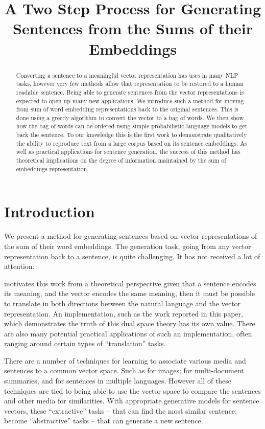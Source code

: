 \documentclass[11pt]{article}
\title{A Two Step Process for Generating Sentences from the Sums of their Embeddings}
\author{}
\theoremstyle{plain}
\theoremstyle{definition}
\begin{document}
\maketitle

\begin{abstract}
Converting a sentence to a meaningful vector representation has uses in many NLP tasks, however very few methods allow that representation to be restored to a human readable sentence. Being able to generate sentences from the vector representations is expected to open up many new applications. We introduce such a method for moving from sum of word embedding representations back to the original sentences. This is done using a greedy algorithm to convert the vector to a bag of words. We then show how the bag of words can be ordered using simple probabilistic language models to get back the sentence. To our knowledge this is the first work to demonstrate qualitatively the ability to reproduce text from a large corpus based on its sentence embeddings. 
As well as practical applications for sentence generation, the success of this method has theoretical implications on the degree of information maintained by the sum of embeddings representation.
\end{abstract}

\section{Introduction} \label{intro}
We present a method for generating sentences based on vector representations of the sum of their word embeddings. The generation task, going from any vector representation back to a sentence, is quite challenging. It has not received a lot of attention.

\textcite{Dinu2014CompositionalGeneration} motivates this work from a theoretical perspective given that a sentence encodes its meaning, and the vector encodes the same meaning, then it must be possible to translate in both directions between the natural language and the vector representation. An implementation, such as the work reported in this paper, which demonstrates the truth of this dual space theory has its own value. There are also many potential practical applications of such an implementation, often ranging around certain types of ``translation'' tasks.

There are a number of techniques for learning to associate various media and sentences to a common vector space. Such as  \textcite{farhadi2010every,socherDTRNN} for images; \textcite{KaagebExtractiveSummaristation,yogatamaextractive} for multi-document summaries, and \textcite{zhang2014BRAE} for sentences in multiple languages. However all of these techniques are tied to being able to use the vector space to compare the sentences and other media for similarities. With appropriate generative models for sentence vectors, these ``extractive'' tasks -- that can find the most similar sentence; become ``abstractive'' tasks -- that can generate a new sentence.
\end{document}
